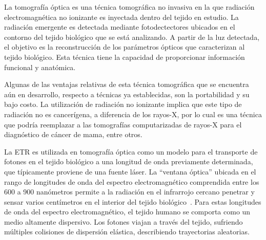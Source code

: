  La tomografía óptica es una técnica tomográfica no invasiva en la que
 radiación electromagnética no ionizante es inyectada dentro del tejido en estudio.
 La radiación emergente es detectada mediante fotodectectores 
 ubicados en el contorno del tejido biológico que se está analizando. A
  partir de la luz detectada, el objetivo es la reconstrucción de
 los parámetros ópticos que caracterizan al tejido biológico. Esta técnica 
 tiene la capacidad de proporcionar información funcional y anatómica. 
 
 Algunas de las ventajas relativas de esta técnica tomográfica que se encuentra aún en desarrollo, respecto a 
 técnicas ya establecidas, son la portabilidad y su bajo costo. 
 La utilización de radiación no 
 ionizante implica que este tipo de radiación no es cancerígena, a diferencia de los rayos-X, 
 por lo cual es una técnica que podría reemplazar a las tomografías 
 computarizadas de rayos-X para el diagnóstico de cáncer de mama, entre otros. 
 
 La ETR es utilizada 
 en tomografía óptica como
 un modelo para el transporte de fotones en el tejido biológico a una longitud de onda previamente determinada, 
 que típicamente proviene de una fuente láser.
 La ``ventana óptica'' ubicada en el rango de longitudes de onda del espectro electromagnético comprendida entre los 600 a 900 nanómetros permite a la radiación en el 
 infrarrojo cercano penetrar y sensar varios centímetros en el interior del tejido biológico~\cite{Boas2001}. 
 Para estas longitudes de onda del espectro electromagnético, el tejido humano se comporta 
 como un medio altamente dispersivo. Los fotones viajan a través del
 tejido, sufriendo múltiples colisiones de dispersión elástica, describiendo trayectorias 
aleatorias.

